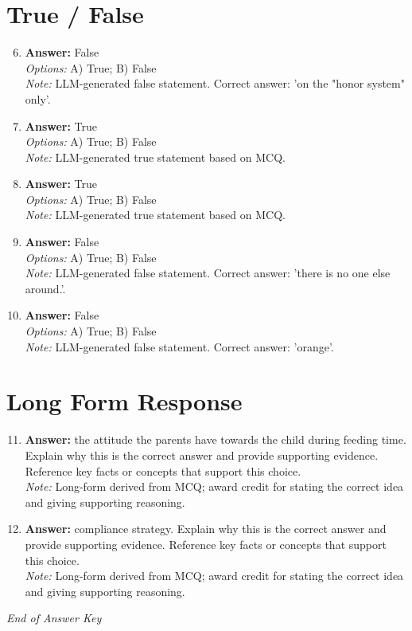 \documentclass[12pt]{article}
\begin{document}
\section*{True / False}
\begin{enumerate}[label=\arabic*.]
\setcounter{enumi}{5}
\item \textbf{Answer:} False
\\ \textit{Options:} A) True; B) False
\\ \textit{Note:} LLM-generated false statement. Correct answer: 'on the "honor system" only'.
\item \textbf{Answer:} True
\\ \textit{Options:} A) True; B) False
\\ \textit{Note:} LLM-generated true statement based on MCQ.
\item \textbf{Answer:} True
\\ \textit{Options:} A) True; B) False
\\ \textit{Note:} LLM-generated true statement based on MCQ.
\item \textbf{Answer:} False
\\ \textit{Options:} A) True; B) False
\\ \textit{Note:} LLM-generated false statement. Correct answer: 'there is no one else around.'.
\item \textbf{Answer:} False
\\ \textit{Options:} A) True; B) False
\\ \textit{Note:} LLM-generated false statement. Correct answer: 'orange'.
\end{enumerate}

\section*{Long Form Response}
\begin{enumerate}[label=\arabic*.]
\setcounter{enumi}{10}
\item \textbf{Answer:} the attitude the parents have towards the child during feeding time. Explain why this is the correct answer and provide supporting evidence. Reference key facts or concepts that support this choice.
\\ \textit{Note:} Long-form derived from MCQ; award credit for stating the correct idea and giving supporting reasoning.
\item \textbf{Answer:} compliance strategy. Explain why this is the correct answer and provide supporting evidence. Reference key facts or concepts that support this choice.
\\ \textit{Note:} Long-form derived from MCQ; award credit for stating the correct idea and giving supporting reasoning.
\end{enumerate}

\vfill
\noindent\textit{End of Answer Key}
\end{document}
